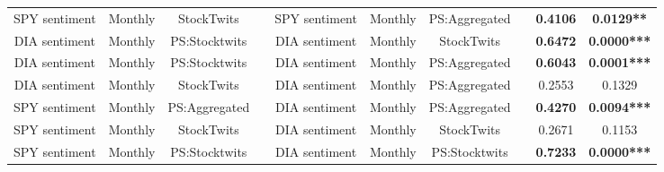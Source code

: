 \begin{table}[htbp]
\begin{tabular}{cccccccccc}
    SPY sentiment & Monthly & StockTwits    &       & SPY sentiment & Monthly & PS:Aggregated &       & \textbf{0.4106} & \textbf{0.0129**} \\
    DIA sentiment & Monthly & PS:Stocktwits &       & DIA sentiment & Monthly & StockTwits    &       & \textbf{0.6472} & \textbf{0.0000***} \\
    DIA sentiment & Monthly & PS:Stocktwits &       & DIA sentiment & Monthly & PS:Aggregated &       & \textbf{0.6043} & \textbf{0.0001***} \\
    DIA sentiment & Monthly & StockTwits    &       & DIA sentiment & Monthly & PS:Aggregated &       & 0.2553          & 0.1329 \\
    SPY sentiment & Monthly & PS:Aggregated &       & DIA sentiment & Monthly & PS:Aggregated &       & \textbf{0.4270} & \textbf{0.0094***} \\
    SPY sentiment & Monthly & StockTwits    &       & DIA sentiment & Monthly & StockTwits    &       & 0.2671          & 0.1153 \\
    SPY sentiment & Monthly & PS:Stocktwits &       & DIA sentiment & Monthly & PS:Stocktwits &       & \textbf{0.7233} & \textbf{0.0000***} \\
    \end{tabular}%
  \label{tab:appendix2}%
\end{table}%
